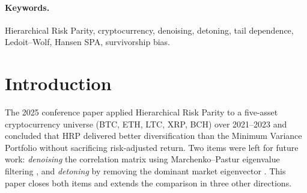 \documentclass[11pt,a4paper]{article}
\begin{document}
\paragraph{Keywords.} Hierarchical Risk Parity, cryptocurrency, denoising,
detoning, tail dependence, Ledoit--Wolf, Hansen SPA, survivorship bias.

\section{Introduction}

The 2025 conference paper \citep{matys2025maci} applied Hierarchical Risk Parity
\citep{lopezdeprado2016hrp} to a five-asset cryptocurrency universe
(BTC, ETH, LTC, XRP, BCH) over 2021--2023 and concluded that HRP
delivered better diversification than the Minimum Variance Portfolio
without sacrificing risk-adjusted return. Two items were left for
future work: \emph{denoising} the correlation matrix using
Marchenko--Pastur eigenvalue filtering \citep{marchenko1967,laloux1999},
and \emph{detoning} by removing the dominant market eigenvector
\citep{lopezdeprado2020mlam}. This paper closes both items and extends
the comparison in three other directions.
\end{document}
